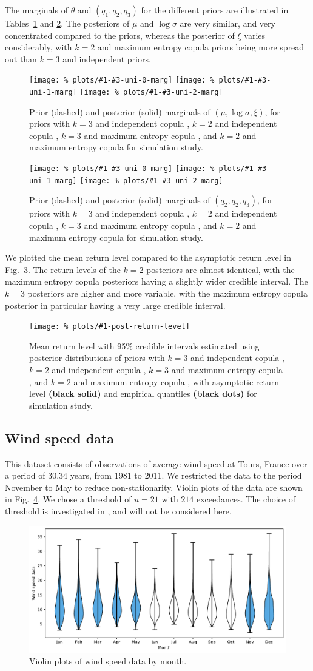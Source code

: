 \documentclass{article}
\newcommand{\marginals}[6]{
	\begin{figure}
		\centering
		\texttt{[image: \%
						plots/\#1-\#3-uni-0-marg]}
		\texttt{[image: \%
						plots/\#1-\#3-uni-1-marg]}
		\texttt{[image: \%
						plots/\#1-\#3-uni-2-marg]}
		\caption{Prior (dashed) and posterior (solid) marginals of
			$(#4, #5, #6)$, for priors with
			$k = 3$ and independent copula \textbf{\color{blue}{(blue)}},
			$k = 2$ and independent copula \textbf{\color{green}{(green)}},
			$k = 3$ and maximum entropy copula
			\textbf{\color{orange}{(orange)}}, and
			$k = 2$ and maximum entropy copula \textbf{\color{red}{(red)}}
			for #2.}
		\label{table:#1-#3-uni-marg}
	\end{figure}
}
\newcommand{\allmarginals}[2]{
	\marginals{#1}{#2}{theta}{\mu}{\log\sigma}{\xi}
	\marginals{#1}{#2}{q}{q_2}{q_2}{q_3}
}
\newcommand{\allreturnlevels}[2]{
	\begin{figure}
		\centering
		\texttt{[image: \%
						plots/\#1-post-return-level]}
		\caption{Mean return level with 95\% credible intervals
			estimated using posterior distributions of priors with
			$k = 3$ and independent copula \textbf{\color{blue}{(blue)}},
			$k = 2$ and independent copula \textbf{\color{green}{(green)}},
			$k = 3$ and maximum entropy copula
			\textbf{\color{orange}{(orange)}}, and
			$k = 2$ and maximum entropy copula \textbf{\color{red}{(red)}},
			with asymptotic return level {\color{black} \textbf{(black solid)}}
			and empirical quantiles {\color{black} \textbf{(black dots)}}
			for #2.}
		\label{table:#1-post-return-level}
	\end{figure}
}
\begin{document}
%
The marginals of
$\theta$ and $(q_1, q_2, q_3)$ for the different priors are illustrated
in Tables~\ref{table:ppp-theta-uni-marg} and
\ref{table:ppp-q-uni-marg}.
The posteriors of $\mu$ and $\log\sigma$ are very similar,
and very concentrated compared to the priors, whereas the
posterior of $\xi$ varies considerably,
with $k = 2$ and maximum entropy copula priors being more spread out
than $k = 3$ and independent priors.
%
\allmarginals{ppp}{simulation study}
%

%
We plotted the mean return level compared to the asymptotic return level
in Fig.~\ref{table:ppp-post-return-level}.
The return levels of the $k = 2$ posteriors are almost identical,
with the maximum entropy copula posteriors
having a slightly wider credible interval.
The $k = 3$ posteriors are higher and more variable,
with the maximum entropy copula posterior
in particular having a very large credible interval.
%
\allreturnlevels{ppp}{simulation study}
%
\FloatBarrier
\subsection{Wind speed data}
%

%
This dataset consists of observations of average wind speed
at Tours, France over a period of $30.34$ years, from 1981 to 2011.
We restricted the data to the period November to May
to reduce non-stationarity.
Violin plots of the data are shown in Fig.~\ref{fig:ws-violinplot}.
We chose a threshold of $u = 21$ with $214$ exceedances.
The choice of threshold is investigated in \cite{coles2001},
and will not be considered here.
%
\begin{figure}
	\centering
	\includegraphics[width=1\linewidth]{plots/ws-boxplot.pdf}
	\caption{Violin plots of wind speed data by month.}
	\label{fig:ws-violinplot}
\end{figure}
%
\end{document}
